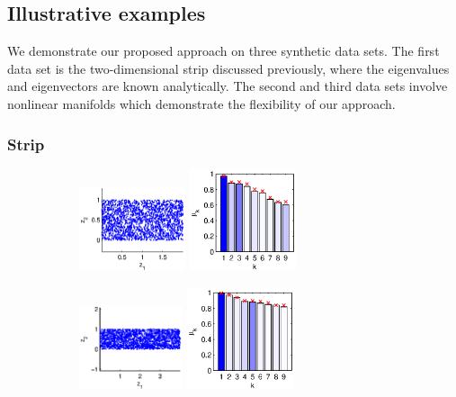 \documentclass[3p]{elsarticle}
\begin{document}
\subsection{Illustrative examples} \label{sec:illustrative_examples}

We demonstrate our proposed approach on three synthetic data sets.
%
The first data set is the two-dimensional strip discussed previously, where the eigenvalues and eigenvectors are known analytically.
%
The second and third data sets involve nonlinear manifolds which demonstrate the flexibility of our approach.

\subsubsection{Strip}

\begin{figure}[!t]
\centering
\begin{subfigure}{0.25\textwidth}
\includegraphics[height=2.5cm]{strip_data_L2}
\includegraphics[height=3cm]{strip_spectrum_L2}
\caption{}
\end{subfigure}
%
%
\begin{subfigure}{0.25\textwidth}
\includegraphics[height=2.5cm]{strip_data_L4}
\includegraphics[height=3cm]{strip_spectrum_L4}
\caption{}

\end{subfigure}
\end{figure}
\end{document}
